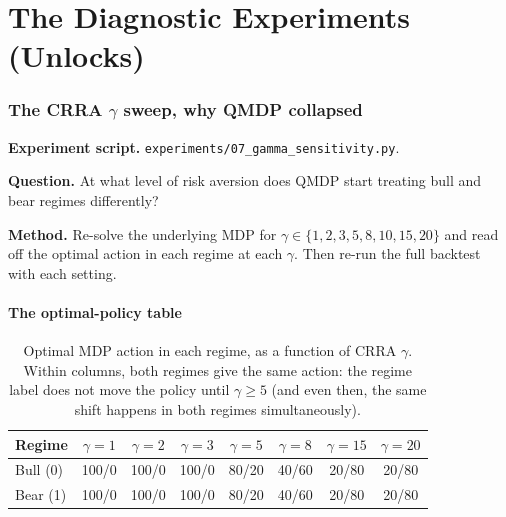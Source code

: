 \documentclass[11pt]{article}
\begin{document}
\part{The Diagnostic Experiments (Unlocks)}\label{sec:unlocks}

\section{The CRRA $\gamma$ sweep, why QMDP collapsed}\label{sec:gamma-walkthrough}

\textbf{Experiment script.} \texttt{experiments/07\_gamma\_sensitivity.py}.

\textbf{Question.} At what level of risk aversion does QMDP start treating bull and bear regimes differently?

\textbf{Method.} Re-solve the underlying MDP for $\gamma \in \{1, 2, 3, 5, 8, 10, 15, 20\}$ and read off the optimal action in each regime at each $\gamma$. Then re-run the full backtest with each setting.

\subsection{The optimal-policy table}

\begin{table}[H]\centering\small\setlength{\tabcolsep}{6pt}\renewcommand{\arraystretch}{1.1}
\caption{Optimal MDP action in each regime, as a function of CRRA $\gamma$. Within columns, both regimes give the same action: the regime label does not move the policy until $\gamma \geq 5$ (and even then, the same shift happens in both regimes simultaneously).}\label{tab:gamma-policy}
\begin{tabular}{lccccccc}
\toprule
\textbf{Regime} & $\gamma{=}1$ & $\gamma{=}2$ & $\gamma{=}3$ & $\gamma{=}5$ & $\gamma{=}8$ & $\gamma{=}15$ & $\gamma{=}20$ \\
\midrule
Bull (0) & 100/0 & 100/0 & 100/0 & 80/20 & 40/60 & 20/80 & 20/80 \\
Bear (1) & 100/0 & 100/0 & 100/0 & 80/20 & 40/60 & 20/80 & 20/80 \\
\bottomrule
\end{tabular}
\end{table}
\end{document}
